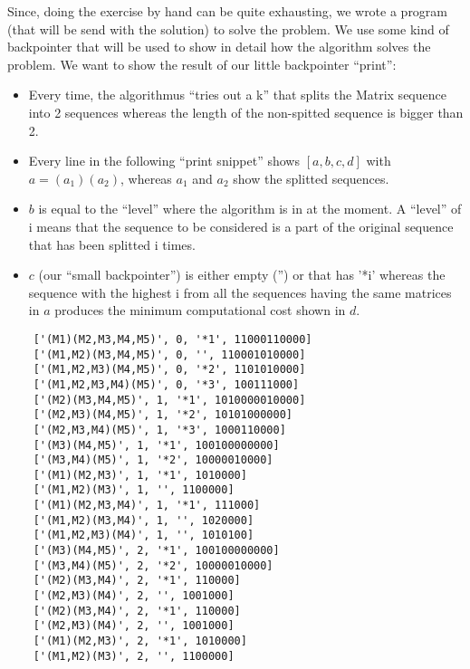 Since, doing the exercise by hand can be quite exhausting, we wrote a program (that will be send with the solution) to solve the problem. We use some kind of backpointer that will be used to show in detail how the algorithm solves the problem.
We want to show the result of our little backpointer ``print'': 
\begin{itemize}
	\item Every time, the algorithmus ``tries out a k'' that splits the 
Matrix sequence into 2 sequences whereas the length of the non-spitted sequence is bigger than 2.
	\item Every line in the following ``print snippet'' shows 
$[a,b,c,d]$ with $a=(a_1)(a_2)$, whereas $a_1$ and $a_2$ show the splitted sequences.
	\item $b$ is equal to the ``level'' where the algorithm is in at the moment. A ``level'' of i means that the sequence to be considered is a part of the original sequence that has been splitted i times.
	\item  $c$ (our ``small backpointer'') is either empty ('') or that has '*i' whereas the sequence with the highest i from all the sequences 
having the same matrices in $a$ produces the minimum computational cost shown in $d$. 
\end{itemize}


\begin{lstlisting}
	['(M1)(M2,M3,M4,M5)', 0, '*1', 11000110000] 
	['(M1,M2)(M3,M4,M5)', 0, '', 110001010000]  
	['(M1,M2,M3)(M4,M5)', 0, '*2', 1101010000]  
	['(M1,M2,M3,M4)(M5)', 0, '*3', 100111000]   
	['(M2)(M3,M4,M5)', 1, '*1', 1010000010000]  
	['(M2,M3)(M4,M5)', 1, '*2', 10101000000]    
	['(M2,M3,M4)(M5)', 1, '*3', 1000110000]     
	['(M3)(M4,M5)', 1, '*1', 100100000000]      
	['(M3,M4)(M5)', 1, '*2', 10000010000]       
	['(M1)(M2,M3)', 1, '*1', 1010000]           
	['(M1,M2)(M3)', 1, '', 1100000]             
	['(M1)(M2,M3,M4)', 1, '*1', 111000]         
	['(M1,M2)(M3,M4)', 1, '', 1020000]          
	['(M1,M2,M3)(M4)', 1, '', 1010100]          
	['(M3)(M4,M5)', 2, '*1', 100100000000]      
	['(M3,M4)(M5)', 2, '*2', 10000010000]       
	['(M2)(M3,M4)', 2, '*1', 110000]            
	['(M2,M3)(M4)', 2, '', 1001000]             
	['(M2)(M3,M4)', 2, '*1', 110000]            
	['(M2,M3)(M4)', 2, '', 1001000]             
	['(M1)(M2,M3)', 2, '*1', 1010000]           
	['(M1,M2)(M3)', 2, '', 1100000]
\end{lstlisting}

